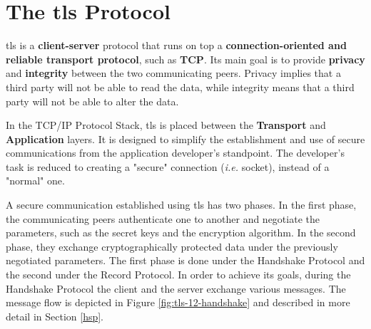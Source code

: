 \documentclass{llncs}
\begin{document}
\section{The \gls{tls} Protocol}

\gls{tls} is a \textbf{client-server} protocol
that runs on top a \textbf{connection-oriented and reliable transport protocol},
such as \textbf{TCP}. Its main goal is to provide \textbf{privacy} and \textbf{integrity}
between the two communicating peers. Privacy implies that a third party will not
be able to read the data, while integrity means that a third party will not be
able to alter the data.

In the TCP/IP Protocol Stack, \gls{tls} is placed between the \textbf{Transport}
and \textbf{Application} layers. It is designed to simplify the establishment
and use of secure communications from the application developer's standpoint.
The developer's task is reduced to creating a "secure" connection (\textit{i.e.} socket), instead of a "normal" one.

A secure communication established using \gls{tls} has two phases. In the first
phase, the communicating peers authenticate one to another and negotiate the parameters, such as the secret keys and the encryption algorithm. In the
second phase, they exchange cryptographically protected data under
the previously negotiated parameters. The first phase is done under the
Handshake Protocol and the second under the Record Protocol. In order to
achieve its goals, during the Handshake Protocol the client and the server
exchange various messages. The message flow is depicted in Figure \ref{fig:tls-12-handshake} and described in more detail in Section
\ref{hsp}.
\end{document}
